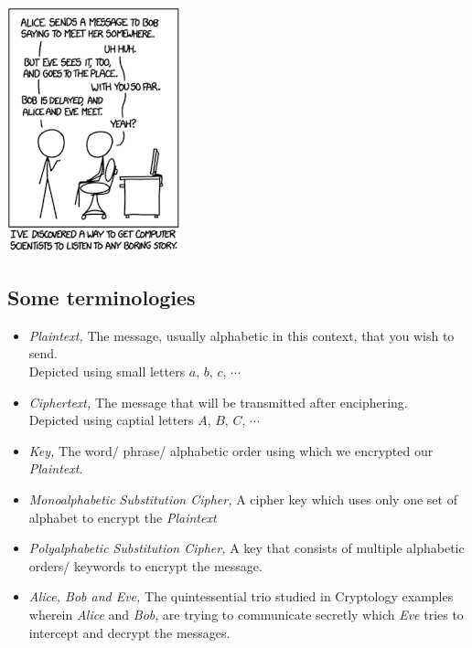 

\newtheorem*{remark}{}
\newtheorem*{definition}{Definition}

\begin{center}
	\includegraphics{Photos/chapter_cover_1.png}
\end{center}

	

		\subsection{Some terminologies}
		\begin{itemize}
			\item \emph{Plaintext,} The message, usually alphabetic in this context, that you wish to send. \\ Depicted using small letters \(a\), \(b\), \(c\), \( \cdots \) 

			\item \emph{Ciphertext,} The message that will be transmitted after enciphering. \\ Depicted using captial letters \(A\), \(B\), \(C\), \(\cdots\)

			\item \emph{Key,} The word/ phrase/ alphabetic order using which we encrypted our \emph{Plaintext}.

			\item \emph{Monoalphabetic Substitution Cipher,} A cipher key which uses only one set of alphabet to encrypt the \emph{Plaintext}

			\item \emph{Polyalphabetic Substitution Cipher,} A key that consists of multiple alphabetic orders/  keywords to encrypt the message.  

			\item \emph{Alice, Bob and Eve,} The quintessential trio studied in Cryptology examples wherein \emph{Alice} and \emph{Bob}, are trying to communicate secretly which \emph{Eve} tries to intercept and decrypt the messages.
		\end{itemize}


